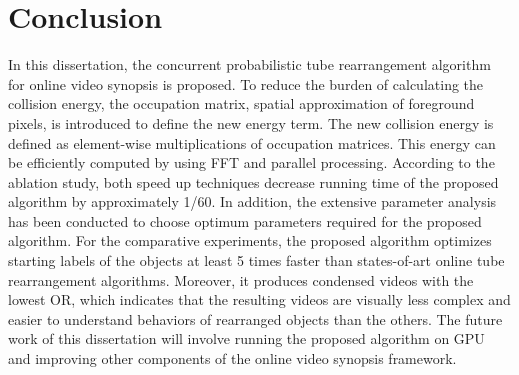 \documentclass[11pt]{hyu_thesis}
\begin{document}
\chapter{Conclusion}
\label{sec:conc}
In this dissertation, the concurrent probabilistic tube rearrangement algorithm for online video synopsis is proposed. To reduce the burden of calculating the collision energy, the occupation matrix, spatial approximation of foreground pixels, is introduced to define the new energy term. The new collision energy is defined as element-wise multiplications of occupation matrices. This energy can be efficiently computed by using FFT and parallel processing. According to the ablation study, both speed up techniques decrease running time of the proposed algorithm by approximately 1/60. In addition, the extensive parameter analysis has been conducted to choose optimum parameters required for the proposed algorithm. For the comparative experiments, the proposed algorithm optimizes starting labels of the objects at least 5 times faster than states-of-art online tube rearrangement algorithms. Moreover, it produces condensed videos with the lowest OR, which indicates that the resulting videos are visually less complex and easier to understand behaviors of rearranged objects than the others. The future work of this dissertation will involve running the proposed algorithm on GPU and improving other components of the online video synopsis framework.



\end{document}
